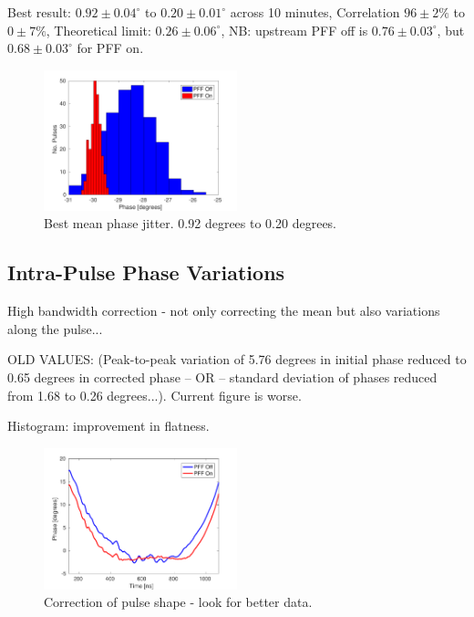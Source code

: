 \documentclass[%
 reprint,
 amsmath,amssymb,
 aps,
]{revtex4-1}
\begin{document}
Best result:
\(0.92\pm0.04^\circ\) to \(0.20\pm0.01^\circ\)  across 10 minutes,
Correlation \(96\pm2\%\) to \(0\pm7\%\),
Theoretical limit: \(0.26\pm0.06^\circ\),
NB: upstream PFF off is \(0.76\pm0.03^\circ\), but \(0.68\pm0.03^\circ\) for 
PFF on.


\begin{figure}
\includegraphics[width=0.5\textwidth]{figs/BestFF_meanJit}%
\caption{\label{fig:meanJit}Best mean phase jitter. 0.92 degrees to 0.20 
degrees.}
\end{figure}


\subsection{\label{ss:shape}Intra-Pulse Phase Variations}

High bandwidth correction - not only correcting the mean but also variations 
along the pulse...

OLD VALUES: (Peak-to-peak variation of 5.76 degrees in initial phase reduced to 
0.65 degrees in corrected phase -- OR -- standard deviation of phases reduced 
from 1.68 to 0.26 degrees...). Current figure is worse.

Histogram: improvement in flatness.

\begin{figure}
\includegraphics[width=0.5\textwidth]{figs/BestFF_shape}%
\caption{\label{fig:shape}Correction of pulse shape - look for better data.}
\end{figure}
\end{document}
